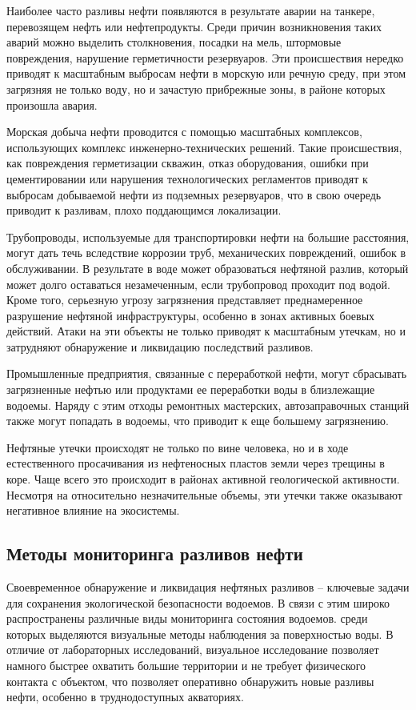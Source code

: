Наиболее часто разливы нефти появляются в результате аварии на танкере, перевозящем нефть или нефтепродукты. Среди причин возникновения таких аварий можно выделить столкновения, посадки на мель, штормовые повреждения, нарушение герметичности резервуаров. Эти происшествия нередко приводят к масштабным выбросам нефти в морскую или речную среду, при этом загрязняя не только воду, но и зачастую прибрежные зоны, в районе которых произошла авария.
 
Морская добыча нефти проводится с помощью масштабных комплексов, использующих комплекс инженерно-технических решений. Такие происшествия, как повреждения герметизации скважин, отказ оборудования, ошибки при цементировании или нарушения технологических регламентов приводят к выбросам добываемой нефти из подземных резервуаров, что в свою очередь приводит к разливам, плохо поддающимся локализации.

Трубопроводы, используемые для транспортировки нефти на большие расстояния, могут дать течь вследствие коррозии труб, механических повреждений, ошибок в обслуживании. В результате в воде может образоваться нефтяной разлив, который может долго оставаться незамеченным, если трубопровод проходит под водой. Кроме того, серьезную угрозу загрязнения представляет преднамеренное разрушение нефтяной инфраструктуры, особенно в зонах активных боевых действий. Атаки на эти объекты не только приводят к масштабным утечкам, но и затрудняют обнаружение и ликвидацию последствий разливов.

Промышленные предприятия, связанные с переработкой нефти, могут сбрасывать загрязненные нефтью или продуктами ее переработки воды в близлежащие водоемы. Наряду с этим отходы ремонтных мастерских, автозаправочных станций также могут попадать в водоемы, что приводит к еще большему загрязнению.

Нефтяные утечки происходят не только по вине человека, но и в ходе естественного просачивания из нефтеносных пластов земли через трещины в коре. Чаще всего это происходит в районах активной геологической активности. Несмотря на относительно незначительные объемы, эти утечки также оказывают негативное влияние на экосистемы.

\subsection{Методы мониторинга разливов нефти}

Своевременное обнаружение и ликвидация нефтяных разливов -- ключевые задачи для сохранения экологической безопасности водоемов. В связи с этим широко распространены различные виды мониторинга состояния водоемов. среди которых выделяются визуальные методы наблюдения за поверхностью воды. В отличие от лабораторных исследований, визуальное исследование позволяет намного быстрее охватить большие территории и не требует физического контакта с объектом, что позволяет оперативно обнаружить новые разливы нефти, особенно в труднодоступных акваториях. 

